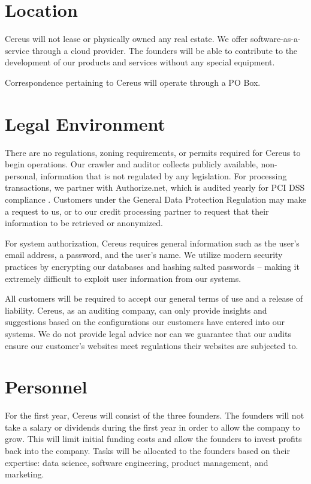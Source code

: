 \section{Location}

Cereus will not lease or physically owned any real estate. We offer software-as-a-service through a cloud provider. The founders will be able to contribute to the development of our products and services without any special equipment. 

Correspondence pertaining to Cereus will operate through a PO Box. 

\section{Legal Environment} \label{legal.environment}

There are no regulations, zoning requirements, or permits required for Cereus to begin operations. Our crawler and auditor collects publicly available, non-personal, information that is not regulated by any legislation. For processing transactions, we partner with Authorize.net, which is audited yearly for PCI DSS compliance \cite{authnet.2020}. Customers under the General Data Protection Regulation may make a request to us, or to our credit processing partner to request that their information to be retrieved or anonymized.

For system authorization, Cereus requires general information such as the user's email address, a password, and the user's name. We utilize modern security practices by encrypting our databases and hashing salted passwords -- making it extremely difficult to exploit user information from our systems.

All customers will be required to accept our general terms of use and a release of liability. Cereus, as an auditing company, can only provide insights and suggestions based on the configurations our customers have entered into our systems. We do not provide legal advice nor can we guarantee that our audits ensure our customer's websites meet regulations their websites are subjected to.

\section{Personnel}

For the first year, Cereus will consist of the three founders. The founders will not take a salary or dividends during the first year in order to allow the company to grow. This will limit initial funding costs and allow the founders to invest profits back into the company. Tasks will be allocated to the founders based on their expertise: data science, software engineering, product management, and marketing.

